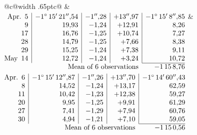 \noindent\begin{tabular}{@{}c@{\hspace{.4em}\vrule width .65pt\hspace{.4em}}c@{}}
 &
 \\[.18ex]
\(\begin{array}[t]{@{}r|r|r|r|r@{}}
\text{Apr.}\enspace 5 & -1^\circ\,15'\,21''{,}54 & -1''{,}28 & +13''{,}97 & -1^\circ\,15'\,8''{,}85\\
9 & 19{,}93 & -1{,}24 & +12{,}91 & 8{,}26\\
17 & 16{,}76 & -1{,}25 & +10{,}74 & 7{,}27\\
28 & 14{,}79 & -1{,}25 & +7{,}66 & 8{,}38\\
29 & 15{,}25 & -1{,}24 & +7{,}38 & 9{,}11\\
\text{May}\enspace 14 & 12{,}72 & -1{,}24 & +3{,}24 & 10{,}72\\
\cline{5-5}
\multicolumn{4}{r}{\text{Mean of 6 observations}} & -1\,15\,8{,}76
\end{array}\)
&
\(\begin{array}[t]{@{}r|r|r|r|r@{}}
\text{Apr.}\enspace 6 & -1^\circ\,15'\,12''{,}87 & -1''{,}26 & +13''{,}70 & -1^\circ\,14'\,60''{,}43\\
8 & 14{,}52 & -1{,}24 & +13{,}17 & 62{,}59\\
11 & 10{,}42 & -1{,}23 & +12{,}38 & 59{,}27\\
20 & 9{,}95 & -1{,}25 & +9{,}91 & 61{,}29\\
27 & 7{,}41 & -1{,}29 & +7{,}94 & 60{,}76\\
30 & 4{,}94 & -1{,}21 & +7{,}10 & 59{,}05\\
\cline{5-5}
\multicolumn{4}{r}{\text{Mean of 6 observations}} & -1\,15\,0{,}56
\end{array}\)
\end{tabular}\par\medskip
